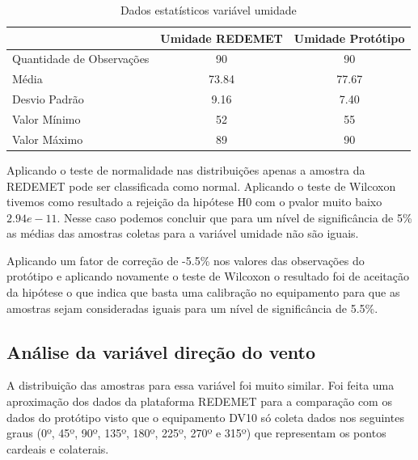 \begin{table}[!h]
\centering
\begin{tabular}{l|c|c|}
\cline{2-3}
                                                & \multicolumn{1}{l|}{\textbf{Umidade REDEMET}} & \textbf{Umidade Protótipo} \\ \hline
\multicolumn{1}{|l|}{Quantidade de Observações} & 90                                            & 90                         \\ \hline
\multicolumn{1}{|l|}{Média}                     & 73.84                                         & 77.67                      \\ \hline
\multicolumn{1}{|l|}{Desvio Padrão}             & 9.16                                          & 7.40                       \\ \hline
\multicolumn{1}{|l|}{Valor Mínimo}              & 52                                            & 55                         \\ \hline
\multicolumn{1}{|l|}{Valor Máximo}              & 89                                            & 90                         \\ \hline
\end{tabular}
\caption{Dados estatísticos variável umidade}
\label{tab:est_desc_umidade_prot}
\end{table}

Aplicando o teste de normalidade nas distribuições apenas a amostra da REDEMET pode ser classificada como normal. Aplicando o teste de Wilcoxon tivemos como resultado a rejeição da hipótese H0 com o pvalor muito baixo $2.94e-11$. Nesse caso podemos concluir que para um nível de significância de 5\% as médias das amostras coletas para a variável umidade não são iguais.

Aplicando um fator de correção de -5.5\% nos valores das observações do protótipo e aplicando novamente o teste de Wilcoxon o resultado foi de aceitação da hipótese o que indica que basta uma calibração no equipamento para que as amostras sejam consideradas iguais para um nível de significância de 5.5\%. 


\subsection{Análise da variável direção do vento}

A distribuição das amostras para essa variável foi muito similar. Foi feita uma aproximação dos dados da plataforma REDEMET para a comparação com os dados do protótipo visto que o equipamento DV10 só coleta dados nos seguintes graus (0º, 45º, 90º, 135º, 180º, 225º, 270º e 315º) que representam os pontos cardeais e colaterais. 

